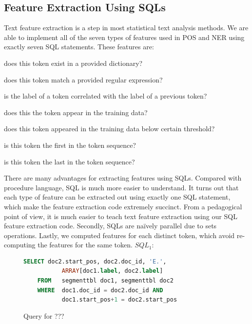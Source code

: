 \documentclass[11pt,letterpaper]{article}
\begin{document}
\subsection{Feature Extraction Using SQLs}
Text feature extraction is a step in most statistical text analysis methods.
We are able to implement all of the seven types of features used in POS and NER using exactly seven 
SQL statements. These features are: 
\begin{description}[noitemsep]
\item[Dictionary features:] does this token exist in a provided dictionary? 
\item[Regex features:] does this token match a provided regular expression? 
\item[Edge features:] is the label of a token correlated with the label of a previous token? 
\item[Word features:] does this the token appear in the training data?
\item[Unknown feature:] does this token appeared in the training data below certain threshold? 
\item[Start feature:] is this token the first in the token sequence?
\item[End feature:] is this token the last in the token sequence?
\end{description}

There are many advantages for extracting features using SQLs.  
Compared with procedure language, SQL is much more easier to understand. 
It turns out that each type of feature can be extracted out using exactly one SQL statement, 
which make the feature extraction code extremely succinct.  
From a pedagogical point of view, it is much easier to teach text feature extraction using our SQL feature extraction code.
Secondly, SQLs are naïvely parallel due to sets operations. 
Lastly, we computed features for each distinct token, which avoid re-computing the features for the same token.  
$SQL_1$:\\
\begin{figure}
\centering
\begin{lstlisting}[language=SQL,gobble=4, breaklines=true]
    SELECT doc2.start_pos, doc2.doc_id, 'E.', 
           ARRAY[doc1.label, doc2.label]
    FROM   segmenttbl doc1, segmenttbl doc2
    WHERE  doc1.doc_id = doc2.doc_id AND 
           doc1.start_pos+1 = doc2.start_pos
\end{lstlisting}
\caption{Query for ??? }
\end{figure}
\end{document}
